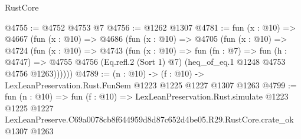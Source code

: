 \begin{lexlean}{RustCore}
\begin{coremodule}
@4755 := @4752 @4753 @7
@4756 := @1262 @1307
@4781 := fun (x : @10) =>
  @4667
    (fun (x : @10) =>
    @4686
      (fun (x : @10) =>
      @4705
        (fun (x : @10) =>
        @4724
          (fun (x : @10) =>
          @4743
            (fun (x : @10) =>
            fun (fn : @7) =>
            fun (h : @4747) =>
            @4755 @4756 (Eq.refl.{2} (Sort 1) @7) (heq_of_eq.{1} @1248 @4753 @4756 @1263))))))
@4789 := (n : @10) -> (f : @10) -> LexLeanPreservation.Rust.FunSem @1223 @1225 @1227 @1307 @1263
@4799 := fun (n : @10) =>
  fun (f : @10) =>
  LexLeanPreservation.Rust.simulate
    @1223
    @1225
    @1227
    LexLeanPreserve.C69a0078cb8f644959d8d87c652d4be05.R29.RustCore.crate_ok
    @1307
    @1263
\end{coremodule}
\end{lexlean}
